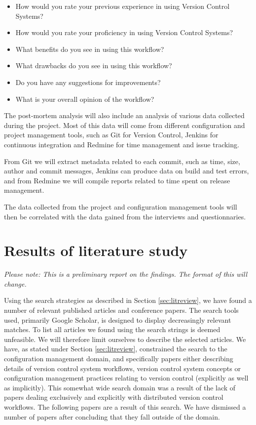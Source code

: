 \documentclass{article}
\begin{document}
\begin{itemize}
 \item How would you rate your previous experience in using Version Control 
       Systems?
 \item How would you rate your proficiency in using Version Control Systems?
 \item What benefits do you see in using this workflow?
 \item What drawbacks do you see in using this workflow?
 \item Do you have any suggestions for improvements?
 \item What is your overall opinion of the workflow?
\end{itemize}

The post-mortem analysis will also include an analysis of various data
collected during the project. Most of this data will come from
different configuration and project management tools, such as Git for
Version Control, Jenkins for continuous integration and Redmine for
time management and issue tracking.

From Git we will extract metadata related to each commit, such as
time, size, author and commit messages, Jenkins can produce data on
build and test errors, and from Redmine we will compile reports
related to time spent on release management.

The data collected from the project and configuration management tools
will then be correlated with the data gained from the interviews and
questionnaries.

\section{Results of literature study}

\begin{center}
 \emph{Please note: This is a preliminary report on the findings. The format
       of this will change.}
\end{center}

Using the search strategies as described in Section \ref{sec:litreview}, 
we have found a number of relevant published articles and conference 
papers.  The search tools used, primarily Google Scholar, is designed to 
display decreasingly relevant matches. To list all articles we found 
using the search strings is deemed unfeasible. We will therefore limit 
ourselves to describe the selected articles. We have, as stated under
Section \ref{sec:litreview}, constrained the search to the configuration
management domain, and specifically papers either describing details of
version control system workflows, version control system concepts or
configuration management practices relating to version control (explicitly
as well as implicitly). This somewhat wide search domain was a result of the
lack of papers dealing exclusively and explicitly with distributed version 
control workflows. The following papers are a result of this search. We
have dismissed a number of papers after concluding that they fall outside of
the domain. 
\end{document}
